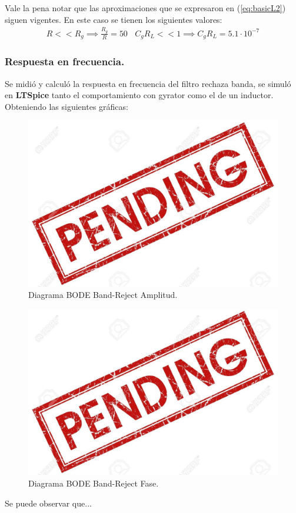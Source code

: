 \documentclass[a4paper]{article}
\begin{document}
Vale la pena notar que las aproximaciones que se expresaron en (\ref{eq:basicL2}) siguen vigentes. En este caso se tienen los siguientes valores:
\begin{align}  R<<R_g \implies  \frac{R_g}{R}=  50 \ \ \ \ C_gR_L << 1 \implies C_gR_L =5.1 \cdot 10^{-7} \end{align}

\subsubsection{Respuesta en frecuencia.}

Se midió y calculó la respuesta en frecuencia del filtro rechaza banda, se simuló en \textbf{LTSpice}  tanto el comportamiento con gyrator como el de un inductor. Obteniendo las siguientes gráficas:
\begin{figure}[H]	
	\centering
	\includegraphics[width=\textwidth]{ImagenesEj2/bodebr.jpg}
	\caption{Diagrama BODE Band-Reject Amplitud.}
	\label{fig:bodebr}
\end{figure}
\begin{figure}[H]	
	\centering
	\includegraphics[width=\textwidth]{ImagenesEj2/bodebrp.jpg}
	\caption{Diagrama BODE Band-Reject Fase.}
	\label{fig:bodebrp}
\end{figure}
Se puede observar que...
\end{document}
